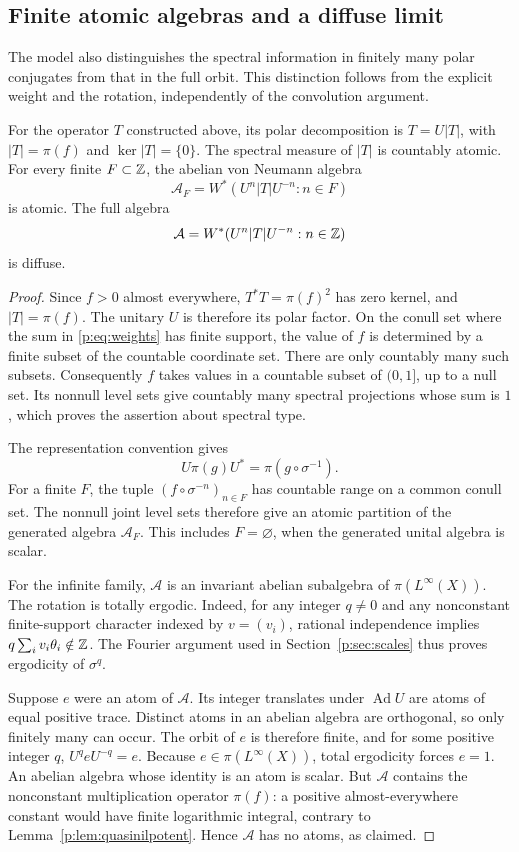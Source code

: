 \subsection{Finite atomic algebras and a diffuse limit}
\label{p:sec:structure}

The model also distinguishes the spectral information in finitely many
polar conjugates from that in the full orbit. This distinction follows
from the explicit weight and the rotation, independently of the
convolution argument.

\begin{proposition}\label{p:prop:joint-structure}
For the operator $T$ constructed above, its polar decomposition is
$T=U|T|$, with $|T|=\pi(f)$ and $\ker|T|=\{0\}$.
The spectral measure of $|T|$ is countably atomic. For every finite
$F\subset\mathbb Z$, the abelian von Neumann algebra
\[
 \mathcal A_F=W^*(U^n|T|U^{-n}:n\in F)
\]
is atomic. The full algebra
\[
 \mathcal A=W^*(U^n|T|U^{-n}:n\in\mathbb Z)
\]
is diffuse.
\end{proposition}

\begin{proof}
Since $f>0$ almost everywhere, $T^*T=\pi(f)^2$ has zero kernel, and
$|T|=\pi(f)$. The unitary $U$ is therefore its polar factor.
On the conull set where the sum in \eqref{p:eq:weights} has finite
support, the value of $f$ is determined by a finite subset of the
countable coordinate set. There are only countably many such subsets.
Consequently $f$ takes values in a countable subset of $(0,1]$, up to a
null set. Its nonnull level sets give countably many spectral projections
whose sum is $1$, which proves the assertion about spectral type.

The representation convention gives
\[
 U\pi(g)U^*=\pi(g\circ\sigma^{-1}).
\]
For a finite $F$, the tuple $(f\circ\sigma^{-n})_{n\in F}$ has
countable range on a common conull set. The nonnull joint level sets
therefore give an atomic partition of the generated algebra
$\mathcal A_F$. This includes $F=\varnothing$, when the generated
unital algebra is scalar.

For the infinite family, $\mathcal A$ is an invariant abelian subalgebra
of $\pi(L^\infty(X))$. The rotation is totally ergodic. Indeed, for any
integer $q\ne0$ and any nonconstant finite-support character indexed by
$v=(v_i)$, rational independence implies
$q\sum_i v_i\theta_i\notin\mathbb Z$. The Fourier argument used in
Section~\ref{p:sec:scales} thus proves ergodicity of $\sigma^q$.

Suppose $e$ were an atom of $\mathcal A$. Its integer translates under
$\operatorname{Ad}U$ are atoms of equal positive trace. Distinct atoms
in an abelian algebra are orthogonal, so only finitely many can occur.
The orbit of $e$ is therefore finite, and for some positive integer $q$,
$U^q eU^{-q}=e$. Because $e\in\pi(L^\infty(X))$, total ergodicity
forces $e=1$. An abelian algebra whose identity is an atom is scalar.
But $\mathcal A$ contains the nonconstant multiplication operator $\pi(f)$: a positive
almost-everywhere constant would have finite logarithmic integral,
contrary to Lemma~\ref{p:lem:quasinilpotent}. Hence $\mathcal A$ has
no atoms, as claimed.
\end{proof}

